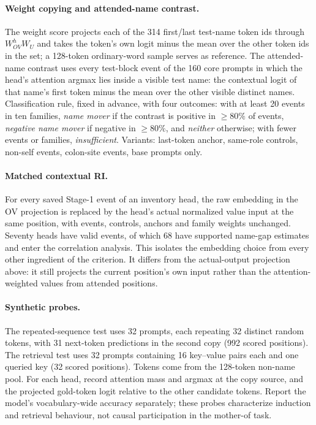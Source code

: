 \paragraph{Weight copying and attended-name contrast.}
The weight score projects each of the 314 first/last test-name token ids through
$W^h_{OV}W_U$ and takes the token's own logit minus the mean over the other token
ids in the set; a 128-token ordinary-word sample serves as reference. The
attended-name contrast uses every test-block event of the 160 core prompts in
which the head's attention argmax lies inside a visible test name: the contextual
logit of that name's first token minus the mean over the other visible distinct
names. Classification rule, fixed in advance, with four outcomes: with at least 20
events in ten families, \emph{name mover} if the contrast is positive in
$\ge80\%$ of events, \emph{negative name mover} if negative in $\ge80\%$, and
\emph{neither} otherwise; with fewer events or families, \emph{insufficient}.
Variants: last-token anchor, same-role controls, non-self events, colon-site events,
base prompts only.

\paragraph{Matched contextual RI.}
For every saved Stage-1 event of an inventory head, the raw embedding in the OV
projection is replaced by the head's actual normalized value input at the same
position, with events, controls, anchors and family weights unchanged. Seventy
heads have valid events, of which 68 have supported name-gap estimates and enter
the correlation analysis. This isolates the embedding choice from every other
ingredient of the criterion. It differs from the actual-output projection above:
it still projects the current position's own input rather than the
attention-weighted values from attended positions.

\paragraph{Synthetic probes.}
The repeated-sequence test uses 32 prompts, each repeating 32 distinct random
tokens, with 31 next-token predictions in the second copy (992 scored positions).
The retrieval test uses 32 prompts containing 16 key--value pairs each and one
queried key (32 scored positions). Tokens come from the 128-token non-name pool.
For each head, record attention mass and argmax at the copy source, and the
projected gold-token logit relative to the other candidate tokens. Report the
model's vocabulary-wide accuracy separately; these probes characterize induction
and retrieval behaviour, not causal participation in the mother-of task.

